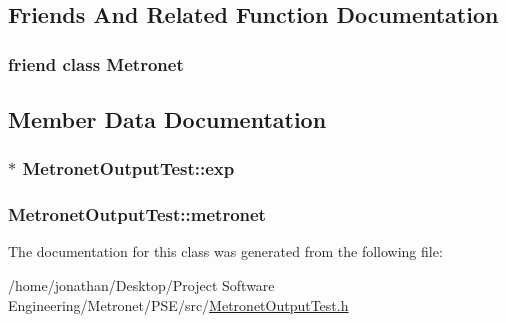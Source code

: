 \subsection{Friends And Related Function Documentation}
\subsubsection[{\texorpdfstring{Metronet}{Metronet}}]{\setlength{\rightskip}{0pt plus 5cm}friend class {\bf Metronet}\hspace{0.3cm}{\ttfamily [friend]}}\hypertarget{class_metronet_output_test_a07c94fb69880743e62f64a941fc2d4ab}{}\label{class_metronet_output_test_a07c94fb69880743e62f64a941fc2d4ab}


\subsection{Member Data Documentation}
\subsubsection[{\texorpdfstring{exp}{exp}}]{$\ast$ Metronet\+Output\+Test\+::exp\hspace{0.3cm}{\ttfamily [protected]}}\hypertarget{class_metronet_output_test_ace0d26029b129b05d3846365c56d42ee}{}\label{class_metronet_output_test_ace0d26029b129b05d3846365c56d42ee}
\subsubsection[{\texorpdfstring{metronet}{metronet}}]{ Metronet\+Output\+Test\+::metronet\hspace{0.3cm}{\ttfamily [protected]}}\hypertarget{class_metronet_output_test_aaa6f34ee762d128cd8aea8c895bb46e4}{}\label{class_metronet_output_test_aaa6f34ee762d128cd8aea8c895bb46e4}


The documentation for this class was generated from the following file\+:\begin{DoxyCompactItemize}
\item 
/home/jonathan/\+Desktop/\+Project Software Engineering/\+Metronet/\+P\+S\+E/src/\hyperlink{_metronet_output_test_8h}{Metronet\+Output\+Test.\+h}\end{DoxyCompactItemize}

